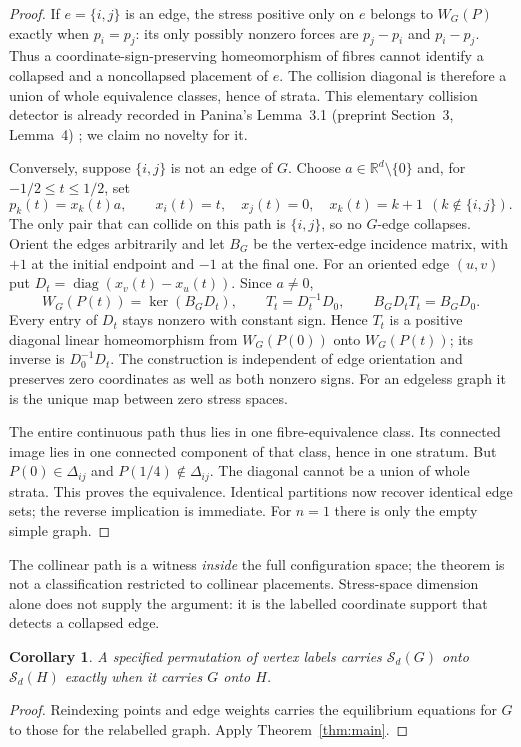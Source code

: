 \documentclass[11pt]{article}
\newtheorem{corollary}[theorem]{Corollary}
\newcommand{\R}{\mathbb R}
\newcommand{\Sg}{\mathcal S}
\begin{document}
\begin{proof}
If $e=\{i,j\}$ is an edge, the stress positive only on $e$ belongs to $W_G(P)$
exactly when $p_i=p_j$: its only possibly nonzero forces are
$p_j-p_i$ and $p_i-p_j$. Thus a coordinate-sign-preserving homeomorphism of
fibres cannot identify a collapsed and a noncollapsed placement of $e$.
The collision diagonal is therefore a union of whole equivalence classes,
hence of strata. This elementary collision detector is already recorded in
Panina's Lemma~3.1 (preprint Section~3, Lemma~4) \cite{Panina}; we claim no novelty for it.

Conversely, suppose $\{i,j\}$ is not an edge of $G$. Choose $a\in\R^d\setminus
\{0\}$ and, for $-1/2\leq t\leq1/2$, set
\[
 p_k(t)=x_k(t)a,\qquad x_i(t)=t,\quad x_j(t)=0,\quad
 x_k(t)=k+1\ \ (k\notin\{i,j\}).
\]
The only pair that can collide on this path is $\{i,j\}$, so no $G$-edge
collapses. Orient the edges arbitrarily and let $B_G$ be the vertex-edge
incidence matrix, with $+1$ at the initial endpoint and $-1$ at the final one.
For an oriented edge $(u,v)$ put
$D_t=\operatorname{diag}(x_v(t)-x_u(t))$. Since $a\ne0$,
\[
 W_G(P(t))=\ker(B_GD_t),\qquad
 T_t=D_t^{-1}D_0,
 \qquad B_GD_tT_t=B_GD_0.
\]
Every entry of $D_t$ stays nonzero with constant sign. Hence $T_t$ is a
positive diagonal linear homeomorphism from $W_G(P(0))$ onto $W_G(P(t))$;
its inverse is $D_0^{-1}D_t$. The construction is independent of edge
orientation and preserves zero coordinates as well as both nonzero signs.
For an edgeless graph it is the unique map between zero stress spaces.

The entire continuous path thus lies in one fibre-equivalence class. Its
connected image lies in one connected component of that class, hence in
one stratum. But $P(0)\in\Delta_{ij}$ and $P(1/4)\notin\Delta_{ij}$.
The diagonal cannot be a union of whole strata. This proves the equivalence.
Identical partitions now recover identical edge sets; the reverse implication
is immediate. For $n=1$ there is only the empty simple graph.
\end{proof}

The collinear path is a witness \emph{inside} the full configuration space;
the theorem is not a classification restricted to collinear placements.
Stress-space dimension alone does not supply the argument: it is the labelled
coordinate support that detects a collapsed edge.

\begin{corollary}
A specified permutation of vertex labels carries $\Sg_d(G)$ onto
$\Sg_d(H)$ exactly when it carries $G$ onto $H$.
\end{corollary}
\begin{proof}
Reindexing points and edge weights carries the equilibrium equations for $G$
to those for the relabelled graph. Apply Theorem~\ref{thm:main}.
\end{proof}
\end{document}

